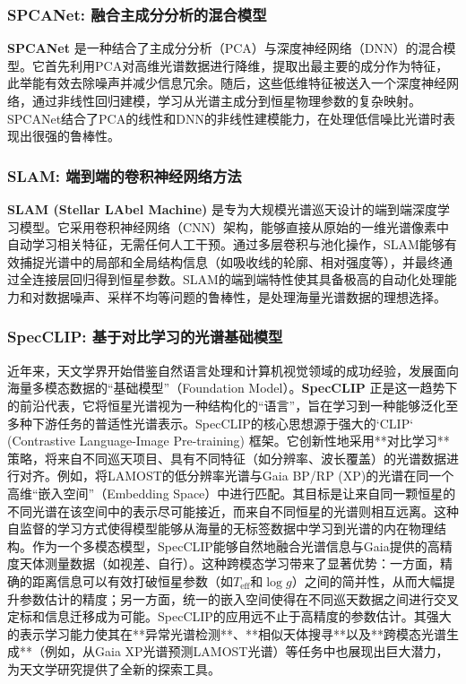 \subsubsection{SPCANet: 融合主成分分析的混合模型}
\textbf{SPCANet} \cite{wang2020spcanet}是一种结合了主成分分析（PCA）与深度神经网络（DNN）的混合模型。它首先利用PCA对高维光谱数据进行降维，提取出最主要的成分作为特征，此举能有效去除噪声并减少信息冗余。随后，这些低维特征被送入一个深度神经网络，通过非线性回归建模，学习从光谱主成分到恒星物理参数的复杂映射。SPCANet结合了PCA的线性和DNN的非线性建模能力，在处理低信噪比光谱时表现出很强的鲁棒性。

\subsubsection{SLAM: 端到端的卷积神经网络方法}
\textbf{SLAM (Stellar LAbel Machine)} \cite{zhang2020slam}是专为大规模光谱巡天设计的端到端深度学习模型。它采用卷积神经网络（CNN）架构，能够直接从原始的一维光谱像素中自动学习相关特征，无需任何人工干预。通过多层卷积与池化操作，SLAM能够有效捕捉光谱中的局部和全局结构信息（如吸收线的轮廓、相对强度等），并最终通过全连接层回归得到恒星参数。SLAM的端到端特性使其具备极高的自动化处理能力和对数据噪声、采样不均等问题的鲁棒性，是处理海量光谱数据的理想选择。

\subsubsection{SpecCLIP: 基于对比学习的光谱基础模型}近年来，天文学界开始借鉴自然语言处理和计算机视觉领域的成功经验，发展面向海量多模态数据的“基础模型”（Foundation Model）。\textbf{SpecCLIP} \cite{li2023, zhang2024} 正是这一趋势下的前沿代表，它将恒星光谱视为一种结构化的“语言”，旨在学习到一种能够泛化至多种下游任务的普适性光谱表示。SpecCLIP的核心思想源于强大的`CLIP` (Contrastive Language-Image Pre-training) 框架。它创新性地采用**对比学习**策略，将来自不同巡天项目、具有不同特征（如分辨率、波长覆盖）的光谱数据进行对齐。例如，将LAMOST的低分辨率光谱与Gaia BP/RP (XP)的光谱在同一个高维“嵌入空间”（Embedding Space）中进行匹配。其目标是让来自同一颗恒星的不同光谱在该空间中的表示尽可能接近，而来自不同恒星的光谱则相互远离。这种自监督的学习方式使得模型能够从海量的无标签数据中学习到光谱的内在物理结构。作为一个多模态模型，SpecCLIP能够自然地融合光谱信息与Gaia提供的高精度天体测量数据（如视差、自行）。这种跨模态学习带来了显著优势：一方面，精确的距离信息可以有效打破恒星参数（如$T_{\text{eff}}$和$\log g$）之间的简并性，从而大幅提升参数估计的精度；另一方面，统一的嵌入空间使得在不同巡天数据之间进行交叉定标和信息迁移成为可能。SpecCLIP的应用远不止于高精度的参数估计。其强大的表示学习能力使其在**异常光谱检测**、**相似天体搜寻**以及**跨模态光谱生成**（例如，从Gaia XP光谱预测LAMOST光谱）等任务中也展现出巨大潜力，为天文学研究提供了全新的探索工具。

